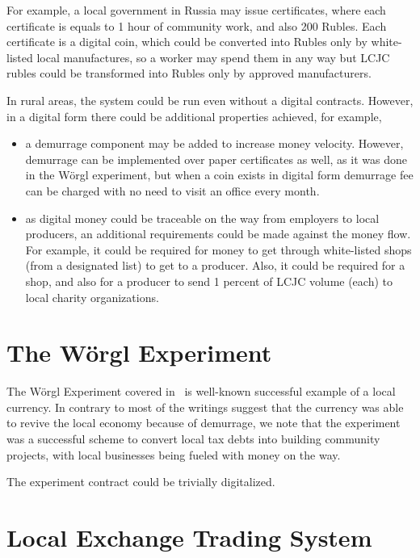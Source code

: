 \documentclass[]{llncs}   %
\begin{document}
For example, a local government in Russia may issue certificates, where each certificate is equals to 1 hour of community work, and also 200 Rubles. Each certificate is a digital coin, which could be converted into Rubles only by white-listed local manufactures, so a worker may spend them in any way but LCJC rubles could be transformed into Rubles only by approved manufacturers.

In rural areas, the system could be run even without a digital contracts. However, in a digital form there could be
additional properties achieved, for example,
    \begin{itemize}
        \item{} a demurrage component may be added to increase money velocity. However, demurrage can be implemented over paper 
        certificates as well, as it was done in the W\"{o}rgl experiment, but when a coin exists in digital form 
         demurrage fee can be charged with no need to visit an office every month.
        \item{} as digital money could be traceable on the way from employers to local producers, an additional
        requirements could be made against the money flow. For example, it could be required for money to get through
        white-listed shops (from a designated list) to get to a producer. Also, it could be required for a shop, and also for a
        producer to send 1 percent of LCJC volume (each) to local charity organizations.
    \end{itemize}

\section{The W\"{o}rgl Experiment}
\label{sec-worgl}

The W\"{o}rgl Experiment covered in~\cite{muralt1934woergl} is well-known successful example of a local currency. In
contrary to most of the writings suggest that the currency was able to revive the local economy because of demurrage, we
 note that the experiment was a successful scheme to convert local tax debts into building community projects, with
 local businesses being fueled with money on the way. %



The experiment contract could be trivially digitalized.

\section{Local Exchange Trading System}
\label{sec-lets}
\end{document}
